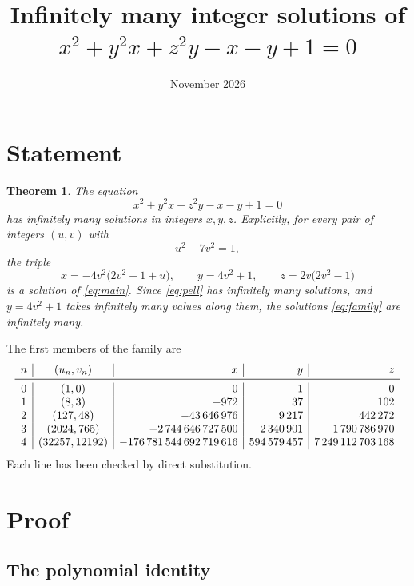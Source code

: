 \documentclass[11pt]{article}
\title{Infinitely many integer solutions of\\ $x^{2}+y^{2}x+z^{2}y-x-y+1=0$}
\author{}
\date{November 2026}
\newtheorem{theorem}{Theorem}
\theoremstyle{remark}
\begin{document}
\maketitle

\section*{Statement}

\begin{theorem}\label{thm:main}
The equation
\begin{equation}\label{eq:main}
x^{2}+y^{2}x+z^{2}y-x-y+1=0
\end{equation}
has infinitely many solutions in integers $x,y,z$. Explicitly, for every pair of
integers $(u,v)$ with
\begin{equation}\label{eq:pell}
u^{2}-7v^{2}=1,
\end{equation}
the triple
\begin{equation}\label{eq:family}
x=-4v^{2}\bigl(2v^{2}+1+u\bigr),\qquad y=4v^{2}+1,\qquad z=2v\bigl(2v^{2}-1\bigr)
\end{equation}
is a solution of \eqref{eq:main}. Since \eqref{eq:pell} has infinitely many
solutions, and $y=4v^{2}+1$ takes infinitely many values along them, the
solutions \eqref{eq:family} are infinitely many.
\end{theorem}

The first members of the family are
\[
\begin{array}{c|c|r|r|r}
n & (u_n,v_n) & x & y & z\\ \midrule
0 & (1,0) & 0 & 1 & 0\\
1 & (8,3) & -972 & 37 & 102\\
2 & (127,48) & -43\,646\,976 & 9\,217 & 442\,272\\
3 & (2024,765) & -2\,744\,646\,727\,500 & 2\,340\,901 & 1\,790\,786\,970\\
4 & (32257,12192) & -176\,781\,544\,692\,719\,616 & 594\,579\,457 & 7\,249\,112\,703\,168
\end{array}
\]
Each line has been checked by direct substitution.

\section{Proof}

\subsection{The polynomial identity}
\end{document}
